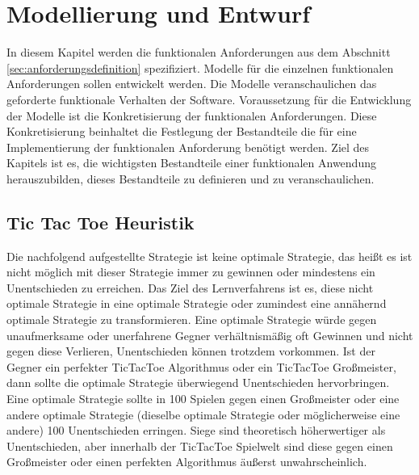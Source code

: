 \chapter{Modellierung und Entwurf}
\label{cha:Modellierung und Entwurf}

In diesem Kapitel werden die funktionalen Anforderungen aus dem Abschnitt \ref{sec:anforderungsdefinition} spezifiziert. Modelle für die einzelnen funktionalen Anforderungen sollen entwickelt werden. Die Modelle veranschaulichen das geforderte funktionale Verhalten der Software. Voraussetzung für die Entwicklung der Modelle ist die Konkretisierung der funktionalen Anforderungen. Diese Konkretisierung beinhaltet die Festlegung der Bestandteile die für eine Implementierung der funktionalen Anforderung benötigt werden. Ziel des Kapitels ist es, die wichtigsten Bestandteile einer funktionalen Anwendung herauszubilden, dieses Bestandteile zu definieren und zu veranschaulichen. 

\section{Tic Tac Toe Heuristik}
\label{sec:Tic Tac Toe Heuristik}
Die nachfolgend aufgestellte Strategie ist keine optimale Strategie, das heißt es ist nicht möglich mit dieser Strategie immer zu gewinnen oder mindestens ein Unentschieden zu erreichen. Das Ziel des Lernverfahrens ist es, diese nicht optimale Strategie in eine optimale Strategie oder zumindest eine annähernd optimale Strategie zu transformieren. Eine optimale Strategie würde gegen unaufmerksame oder unerfahrene Gegner verhältnismäßig oft Gewinnen und nicht gegen diese Verlieren, Unentschieden können trotzdem vorkommen. Ist der Gegner ein perfekter TicTacToe Algorithmus oder ein TicTacToe Großmeister, dann sollte die optimale Strategie überwiegend Unentschieden hervorbringen. Eine optimale Strategie sollte in 100 Spielen gegen einen Großmeister oder eine andere optimale Strategie (dieselbe optimale Strategie oder möglicherweise eine andere) 100 Unentschieden erringen. Siege sind theoretisch höherwertiger als Unentschieden, aber innerhalb der TicTacToe Spielwelt sind diese gegen einen Großmeister oder einen perfekten Algorithmus äußerst unwahrscheinlich. \\

